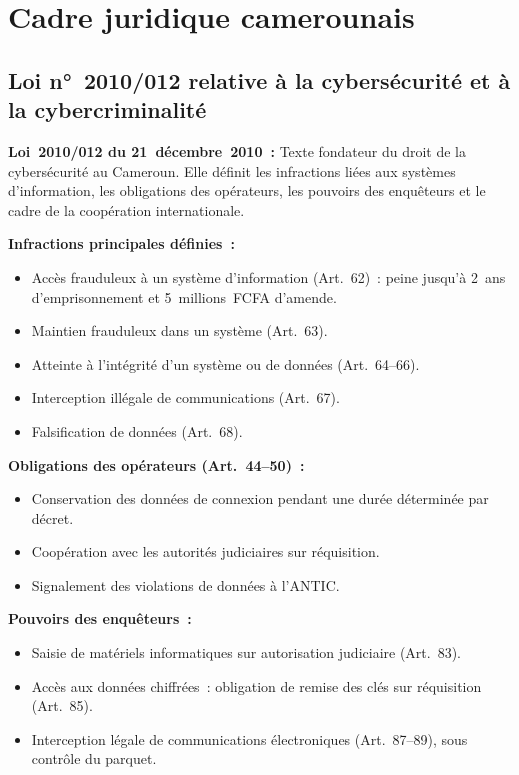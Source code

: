 \section{Cadre juridique camerounais}
\label{sec:droit-cameroun}

\subsection{Loi n°~2010/012 relative à la cybersécurité et à la cybercriminalité}

\begin{boxdef}
\textbf{Loi~2010/012 du 21~décembre~2010~:} Texte fondateur du droit
de la cybersécurité au Cameroun. Elle définit les infractions liées
aux systèmes d'information, les obligations des opérateurs, les pouvoirs
des enquêteurs et le cadre de la coopération internationale.
\end{boxdef}

\textbf{Infractions principales définies~:}
\begin{itemize}
  \item Accès frauduleux à un système d'information (Art.~62)~:
        peine jusqu'à 2~ans d'emprisonnement et 5~millions~FCFA d'amende.
  \item Maintien frauduleux dans un système (Art.~63).
  \item Atteinte à l'intégrité d'un système ou de données (Art.~64--66).
  \item Interception illégale de communications (Art.~67).
  \item Falsification de données (Art.~68).
\end{itemize}

\textbf{Obligations des opérateurs (Art.~44--50)~:}
\begin{itemize}
  \item Conservation des données de connexion pendant une durée
        déterminée par décret.
  \item Coopération avec les autorités judiciaires sur réquisition.
  \item Signalement des violations de données à l'ANTIC.
\end{itemize}

\textbf{Pouvoirs des enquêteurs~:}
\begin{itemize}
  \item Saisie de matériels informatiques sur autorisation judiciaire (Art.~83).
  \item Accès aux données chiffrées~: obligation de remise des clés sur
        réquisition (Art.~85).
  \item Interception légale de communications électroniques (Art.~87--89),
        sous contrôle du parquet.
\end{itemize}

